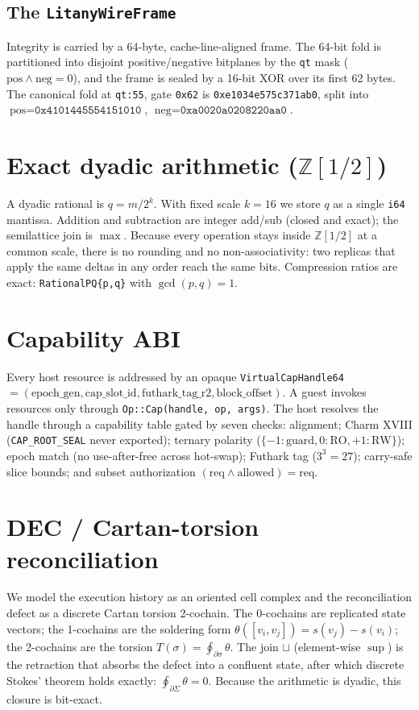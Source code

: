 \documentclass[11pt]{article}
\begin{document}
\subsection{The \texttt{LitanyWireFrame}}
Integrity is carried by a 64-byte, cache-line-aligned frame. The 64-bit fold is
partitioned into disjoint positive/negative bitplanes by the \texttt{qt} mask
($\text{pos}\wedge\text{neg}=0$), and the frame is sealed by a 16-bit XOR over
its first 62 bytes. The canonical fold at \texttt{qt:55}, gate \texttt{0x62} is
\texttt{0xe1034e575c371ab0}, split into
$\text{pos}=\texttt{0x4101445554151010}$,
$\text{neg}=\texttt{0xa0020a0208220aa0}$.

\section{Exact dyadic arithmetic ($\mathbb{Z}[1/2]$)}
A dyadic rational is $q=m/2^k$. With fixed scale $k=16$ we store $q$ as a single
\texttt{i64} mantissa. Addition and subtraction are integer add/sub (closed and
exact); the semilattice join is $\max$. Because every operation stays inside
$\mathbb{Z}[1/2]$ at a common scale, there is no rounding and no
non-associativity: two replicas that apply the same deltas in any order reach
the same bits. Compression ratios are exact: \texttt{RationalPQ\{p,q\}} with
$\gcd(p,q)=1$.

\section{Capability ABI}
Every host resource is addressed by an opaque
\texttt{VirtualCapHandle64} $=(\text{epoch\_gen},\text{cap\_slot\_id},
\text{futhark\_tag\_r2},\text{block\_offset})$. A guest invokes resources only
through \texttt{Op::Cap(handle, op, args)}. The host resolves the handle through
a capability table gated by seven checks: alignment; Charm XVIII
(\texttt{CAP\_ROOT\_SEAL} never exported); ternary polarity
($\{-1{:}\text{guard},0{:}\text{RO},+1{:}\text{RW}\}$); epoch match (no
use-after-free across hot-swap); Futhark tag ($3^3=27$); carry-safe slice
bounds; and subset authorization
$(\text{req}\wedge\text{allowed})=\text{req}$.

\section{DEC / Cartan-torsion reconciliation}
We model the execution history as an oriented cell complex and the
reconciliation defect as a discrete Cartan torsion 2-cochain. The 0-cochains are
replicated state vectors; the 1-cochains are the soldering form
$\theta([v_i,v_j])=s(v_j)-s(v_i)$; the 2-cochains are the torsion
$T(\sigma)=\oint_{\partial\sigma}\theta$. The join $\sqcup$ (element-wise
$\sup$) is the retraction that absorbs the defect into a confluent state, after
which discrete Stokes' theorem holds exactly: $\oint_{\partial\Sigma}\theta=0$.
Because the arithmetic is dyadic, this closure is bit-exact.
\end{document}
